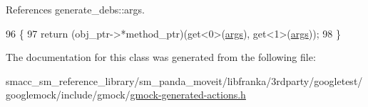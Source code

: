 References generate\+\_\+debs\+::args.


\begin{DoxyCode}
96                                                           \{
97            \textcolor{keywordflow}{return} (obj\_ptr->*method\_ptr)(get<0>(\hyperlink{namespacegenerate__debs_a75f9143e38df82d83b2e8a6f99cae02c}{args}), get<1>(\hyperlink{namespacegenerate__debs_a75f9143e38df82d83b2e8a6f99cae02c}{args}));
98   \}
\end{DoxyCode}


The documentation for this class was generated from the following file\+:\begin{DoxyCompactItemize}
\item 
smacc\+\_\+sm\+\_\+reference\+\_\+library/sm\+\_\+panda\+\_\+moveit/libfranka/3rdparty/googletest/googlemock/include/gmock/\hyperlink{gmock-generated-actions_8h}{gmock-\/generated-\/actions.\+h}\end{DoxyCompactItemize}
